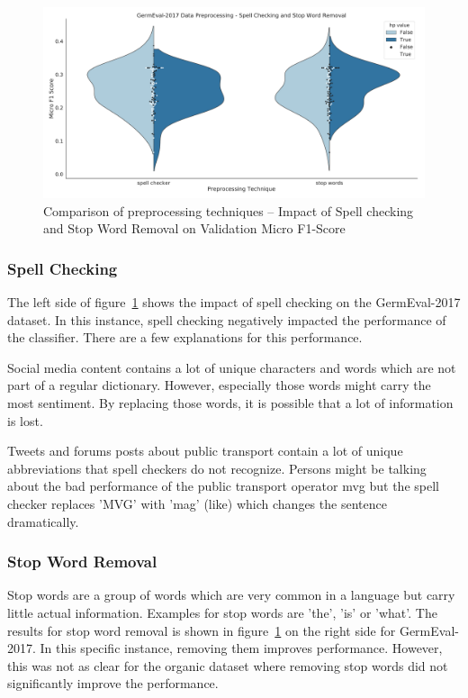 \begin{figure}
    \centering
    \includegraphics[width=\textwidth]{figures/06_results/06_hp_ge_vio_data}
    \caption{Comparison of preprocessing techniques -- Impact of Spell checking and Stop Word Removal on Validation Micro F1-Score}
    \label{fig:06_PreprocessingHp}
\end{figure}

\subsubsection{Spell Checking}
\label{sec:06_spellChecking}

The left side of figure~\ref{fig:06_PreprocessingHp} shows the impact of spell checking on the GermEval-2017 dataset. In this instance, spell checking negatively impacted the performance of the classifier. There are a few explanations for this performance.
\medskip

Social media content contains a lot of unique characters and words which are not part of a regular dictionary. However, especially those words might carry the most sentiment. By replacing those words, it is possible that a lot of information is lost.
\medskip

Tweets and forums posts about public transport contain a lot of unique abbreviations that spell checkers do not recognize. Persons might be talking about the bad performance of the public transport operator \gls{mvg} but the spell checker replaces 'MVG' with 'mag' {(like)} which changes the sentence dramatically.

\subsubsection{Stop Word Removal}

Stop words are a group of words which are very common in a language but carry little actual information. Examples for stop words are 'the', 'is' or 'what'. The results for stop word removal is shown in figure~\ref{fig:06_PreprocessingHp} on the right side for GermEval-2017. In this specific instance, removing them improves performance. However, this was not as clear for the organic dataset where removing stop words did not significantly improve the performance.

